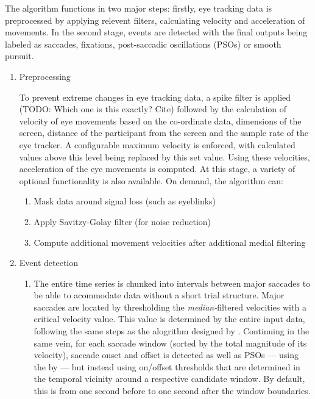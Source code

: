 The algorithm functions in two major steps: firstly, eye tracking data is preprocessed by applying relevent filters, calculating velocity and acceleration of movements. In the second stage, events are detected with the final outputs being labeled as saccades, fixations, post-saccadic oscillations (PSOs) or smooth pursuit.
\begin{enumerate}
\item{Preprocessing}

 To prevent extreme changes in eye tracking data, a spike filter is applied (TODO: Which one is this exactly? Cite) followed by the calculation of velocity of eye movements based on the co-ordinate data,  dimensions of the screen, distance of the participant from the screen and the sample rate of the eye tracker. A configurable maximum velocity is enforced, with calculated values above this level being replaced by this set value. Using these velocities, acceleration of the eye movements is computed. 
 At this stage, a variety of optional functionality is also available. On demand, the algorithm can: 
 \begin{enumerate}
 	\item Mask data around signal loss (such as eyeblinks)
 	\item Apply Savitzy-Golay filter (for noise reduction) 
 	\item Compute additional movement velocities after additional medial filtering
 	
 \end{enumerate}

\item{Event detection}
\begin{enumerate}

 \item The entire time series is chunked into intervals between major saccades to be able to acommodate data without a short trial structure. Major saccades are located by thresholding the \textit{median-}filtered velocities with a critical velocity value. This value is determined by the entire input data, following the same steps as the alogrithm designed by \citet{Nystrom2010AnData}. Continuing in the same vein, for each saccade window (sorted by the total magnitude of its velocity), saccade onset and offset is detected as well as PSOs --- using the by \citet{Nystrom2010AnData} --- but instead using on/offset thresholds that are determined in the temporal vicinity around a respective candidate window. By default, this  is from one second before to one second after the window boundaries.
 

\end{enumerate}
\end{enumerate}
